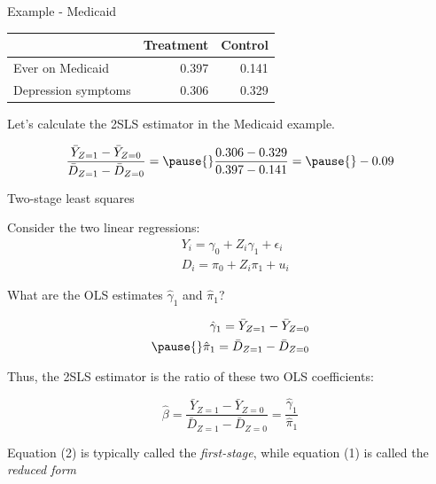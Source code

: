 \documentclass[11pt,english,handout]{beamer}
\newenvironment{wideitemize}{\itemize\addtolength{\itemsep}{10pt}}{\enditemize}
\begin{document}
\begin{frame}{Example - Medicaid}
			\begin{tabular}{lrr}
	& Treatment & Control \\ \hline
	Ever on Medicaid & 0.397 & 0.141 \\
	Depression symptoms & 0.306 &  0.329 
\end{tabular}

\bigskip 
\begin{wideitemize}
	\item
	Let's calculate the 2SLS estimator in the Medicaid example.
	
	\pause
	$$ \dfrac{  \bar{Y}_{Z=1} - \bar{Y}_{Z=0}   }{ \bar{D}_{Z=1} - \bar{D}_{Z=0} }  = \pause{} \frac{0.306 - 0.329}{0.397 - 0.141}  = \pause{} -0.09$$
	
\end{wideitemize}


\end{frame}



\begin{frame}{Two-stage least squares}

\begin{wideitemize}
	\item
	Consider the two linear regressions:
	\begin{align}
		&Y_{i} = \gamma_0 +   Z_i \gamma_1 + \epsilon_{i} \\
		&D_i = \pi_0 + Z_i \pi_1 + u_i
	\end{align}

	\item
	What are the OLS estimates $\hat\gamma_1$ and $\hat\pi_1$? 
	
	\pause
	\begin{align*}
		\hat\gamma_1 = \bar{Y}_{Z=1} - \bar{Y}_{Z=0} \\ \pause{}
		\hat\pi_1 = \bar{D}_{Z=1} - \bar{D}_{Z=0}
	\end{align*}

	
	\pause
	\item
	Thus, the 2SLS estimator is the ratio of these two OLS coefficients:
	
	$$\hat\beta =  \dfrac{  \bar{Y}_{Z=1} - \bar{Y}_{Z=0}   }{ \bar{D}_{Z=1} - \bar{D}_{Z=0} } = \frac{\hat\gamma_1}{\hat\pi_1} $$
	
	
	\pause
	\item
	Equation (2) is typically called the \textit{first-stage}, while equation (1) is called the \textit{reduced form}
\end{wideitemize}	
	
\end{frame}
\end{document}
